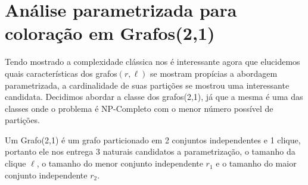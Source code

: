 \chapter{Análise parametrizada para coloração em Grafos(2,1)}
Tendo mostrado a complexidade clássica nos é interessante agora que elucidemos quais características dos grafos$(r,\ell)$ se mostram propícias a abordagem parametrizada, a cardinalidade de suas partições se mostrou uma interessante candidata.
Decidimos abordar a classe dos grafos(2,1), já que a mesma é uma das classes onde o problema é NP-Completo com o menor número possível de partições.

Um Grafo(2,1) é um grafo particionado em 2 conjuntos independentes e 1 clique, portanto ele nos entrega 3 naturais candidatos a parametrização, o tamanho da clique $\ell$, o tamanho do menor conjunto independente $r_1$ e o tamanho do maior conjunto independente $r_2$.

